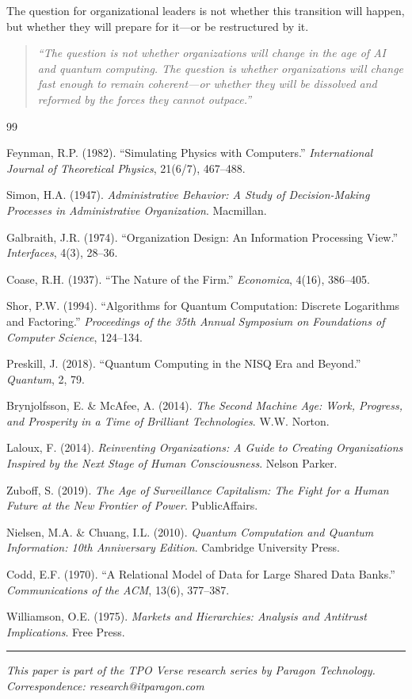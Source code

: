 \documentclass[11pt,a4paper,twocolumn]{article}
\begin{document}
The question for organizational leaders is not whether this transition will happen, but whether they will prepare for it---or be restructured by it.

\begin{quote}
\textit{``The question is not whether organizations will change in the age of AI and quantum computing. The question is whether organizations will change fast enough to remain coherent---or whether they will be dissolved and reformed by the forces they cannot outpace.''}
\end{quote}


{\small
\begin{thebibliography}{99}

Feynman, R.P. (1982). ``Simulating Physics with Computers.'' \textit{International Journal of Theoretical Physics}, 21(6/7), 467--488.

Simon, H.A. (1947). \textit{Administrative Behavior: A Study of Decision-Making Processes in Administrative Organization}. Macmillan.

Galbraith, J.R. (1974). ``Organization Design: An Information Processing View.'' \textit{Interfaces}, 4(3), 28--36.

Coase, R.H. (1937). ``The Nature of the Firm.'' \textit{Economica}, 4(16), 386--405.

Shor, P.W. (1994). ``Algorithms for Quantum Computation: Discrete Logarithms and Factoring.'' \textit{Proceedings of the 35th Annual Symposium on Foundations of Computer Science}, 124--134.

Preskill, J. (2018). ``Quantum Computing in the NISQ Era and Beyond.'' \textit{Quantum}, 2, 79.

Brynjolfsson, E. \& McAfee, A. (2014). \textit{The Second Machine Age: Work, Progress, and Prosperity in a Time of Brilliant Technologies}. W.W. Norton.

Laloux, F. (2014). \textit{Reinventing Organizations: A Guide to Creating Organizations Inspired by the Next Stage of Human Consciousness}. Nelson Parker.

Zuboff, S. (2019). \textit{The Age of Surveillance Capitalism: The Fight for a Human Future at the New Frontier of Power}. PublicAffairs.

Nielsen, M.A. \& Chuang, I.L. (2010). \textit{Quantum Computation and Quantum Information: 10th Anniversary Edition}. Cambridge University Press.

Codd, E.F. (1970). ``A Relational Model of Data for Large Shared Data Banks.'' \textit{Communications of the ACM}, 13(6), 377--387.

Williamson, O.E. (1975). \textit{Markets and Hierarchies: Analysis and Antitrust Implications}. Free Press.

\end{thebibliography}}


\vspace{12pt}
\noindent\rule{\columnwidth}{0.3pt}
\vspace{6pt}
{\footnotesize\textcolor{epochSlate}{\textit{This paper is part of the TPO Verse research series by Paragon Technology. Correspondence: research@itparagon.com}}}
\end{document}
